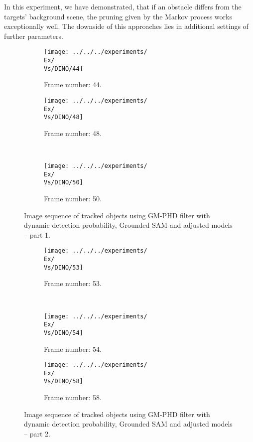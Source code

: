 In this experiment, we have demonstrated, that if an obstacle differs from the targets' background scene, the pruning given by the Markov process works exceptionally well. The downside of this approaches lies in additional settings of further parameters.
\begin{figure}[H]
    \centering
    \begin{subfigure}{\textwidth}
        \centering
        \texttt{[image: ../../../experiments/\\Ex/\\Vs/DINO/44]}
        \caption{Frame number: 44.}
        \label{fig:\Ex-\Vs-\Set:01}
    \end{subfigure}
    \begin{subfigure}{\textwidth}
        \centering
        \texttt{[image: ../../../experiments/\\Ex/\\Vs/DINO/48]}
        \caption{Frame number: 48.}
        \label{fig:\Ex-\Vs-\Set:02}
    \end{subfigure}
    \\
    \begin{subfigure}{\textwidth}
        \centering
        \texttt{[image: ../../../experiments/\\Ex/\\Vs/DINO/50]}
        \caption{Frame number: 50.}
        \label{fig:\Ex-\Vs-\Set:03}
    \end{subfigure}
    \caption{Image sequence of tracked objects using GM-PHD filter with dynamic detection probability, Grounded SAM and adjusted models -- part 1.}
    \label{fig:\Ex-\Vs-\Set_1}
\end{figure}
\begin{figure}[H]

    \begin{subfigure}{\textwidth}
        \centering
        \texttt{[image: ../../../experiments/\\Ex/\\Vs/DINO/53]}
        \caption{Frame number: 53.}
        \label{fig:\Ex-\Vs-\Set:04}
    \end{subfigure}
    \\
    \begin{subfigure}{\textwidth}
        \centering
        \texttt{[image: ../../../experiments/\\Ex/\\Vs/DINO/54]}
        \caption{Frame number: 54.}
        \label{fig:\Ex-\Vs-\Set:05}
    \end{subfigure}
    \begin{subfigure}{\textwidth}
        \centering
        \texttt{[image: ../../../experiments/\\Ex/\\Vs/DINO/58]}
        \caption{Frame number: 58.}
        \label{fig:\Ex-\Vs-\Set:06}
    \end{subfigure}
    \caption{Image sequence of tracked objects using GM-PHD filter with dynamic detection probability, Grounded SAM and adjusted models -- part 2.}
    \label{fig:\Ex-\Vs-\Set_2}
\end{figure}

